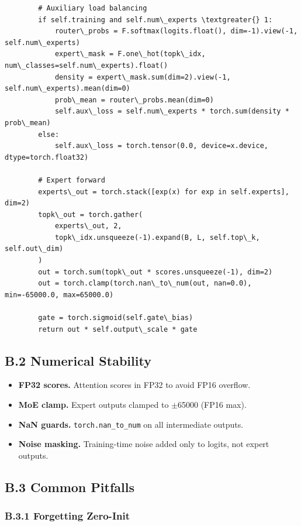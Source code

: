 \begin{lstlisting}
        # Auxiliary load balancing
        if self.training and self.num\_experts \textgreater{} 1:
            router\_probs = F.softmax(logits.float(), dim=-1).view(-1, self.num\_experts)
            expert\_mask = F.one\_hot(topk\_idx, num\_classes=self.num\_experts).float()
            density = expert\_mask.sum(dim=2).view(-1, self.num\_experts).mean(dim=0)
            prob\_mean = router\_probs.mean(dim=0)
            self.aux\_loss = self.num\_experts * torch.sum(density * prob\_mean)
        else:
            self.aux\_loss = torch.tensor(0.0, device=x.device, dtype=torch.float32)
        
        # Expert forward
        experts\_out = torch.stack([exp(x) for exp in self.experts], dim=2)
        topk\_out = torch.gather(
            experts\_out, 2,
            topk\_idx.unsqueeze(-1).expand(B, L, self.top\_k, self.out\_dim)
        )
        out = torch.sum(topk\_out * scores.unsqueeze(-1), dim=2)
        out = torch.clamp(torch.nan\_to\_num(out, nan=0.0), min=-65000.0, max=65000.0)
        
        gate = torch.sigmoid(self.gate\_bias)
        return out * self.output\_scale * gate
\end{lstlisting}

\subsection{B.2 Numerical Stability}

\begin{itemize}
\item \textbf{FP32 scores.} Attention scores in FP32 to avoid FP16 overflow.
\item \textbf{MoE clamp.} Expert outputs clamped to $\pm$65000 (FP16 max).
\item \textbf{NaN guards.} \texttt{torch.nan\_to\_num} on all intermediate outputs.
\item \textbf{Noise masking.} Training-time noise added only to logits, not expert
  outputs.

\end{itemize}
\subsection{B.3 Common Pitfalls}

\subsubsection{B.3.1 Forgetting Zero-Init}

